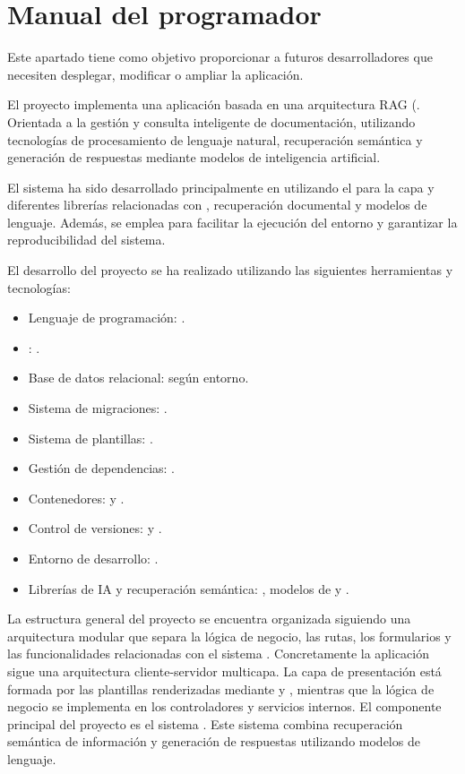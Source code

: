 \section{Manual del programador}
\label{prog:manual}
Este apartado tiene como objetivo proporcionar a futuros desarrolladores que necesiten desplegar, modificar o ampliar la aplicación.

El proyecto implementa una aplicación basada en una arquitectura RAG (. Orientada a la gestión y consulta inteligente de documentación, utilizando tecnologías de procesamiento de lenguaje natural, recuperación semántica y generación de respuestas mediante modelos de inteligencia artificial.

El sistema ha sido desarrollado principalmente en  utilizando el   para la capa  y diferentes librerías relacionadas con , recuperación documental y modelos de lenguaje. Además, se emplea  para facilitar la ejecución del entorno y garantizar la reproducibilidad del sistema.

El desarrollo del proyecto se ha realizado utilizando las siguientes herramientas y tecnologías:
\begin{itemize}
\tightlist
	\item Lenguaje de programación: .
	\item {} : .
	\item Base de datos relacional:  según entorno.
	\item Sistema de migraciones: .
	\item Sistema de plantillas: .
	\item Gestión de dependencias: .
	\item Contenedores:  y .
	\item Control de versiones:  y .
	\item Entorno de desarrollo: .
	\item Librerías de IA y recuperación semántica: , modelos de  y .
\end{itemize}

La estructura general del proyecto se encuentra organizada siguiendo una arquitectura modular que separa la lógica de negocio, las rutas, los formularios y las funcionalidades relacionadas con el sistema . Concretamente la aplicación sigue una arquitectura cliente-servidor multicapa. La capa de presentación está formada por las plantillas  renderizadas mediante  y , mientras que la lógica de negocio se implementa en los controladores y servicios internos. El componente principal del proyecto es el sistema . Este sistema combina recuperación semántica de información y generación de respuestas utilizando modelos de lenguaje.

